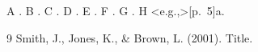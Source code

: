 \documentclass{article}
\begin{document}
A . B . C . D . E .
F . G . H \fullcite<e.g.,>[p.~5]{a}.
\begin{thebibliography}{9}
 Smith, J., Jones, K., \& Brown, L. (2001). Title.
\end{thebibliography}
\end{document}
